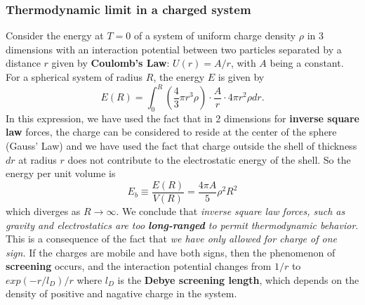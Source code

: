 \documentclass[12pt,titlepage]{article}
\numberwithin{equation}{section}
\begin{document}
\subsubsection{Thermodynamic limit in a charged system}
Consider the energy at $T=0$ of a system of uniform charge density $\rho$ in 3 dimensions with an interaction potential between two particles separated by a distance $r$ given by \textbf{Coulomb's Law}: $U(r)=A/r$, with $A$ being a constant. For a spherical system of radius $R$, the energy $E$ is given by 
\begin{equation}
\label{chargeint}
    E(R) = \int_0^R(\frac{4}{3}\pi r^3\rho)\cdot \frac{A}{r}\cdot 4\pi r^2\rho dr.
\end{equation}
In this expression, we have used the fact that in 2 dimensions for \textbf{inverse square law} forces, the charge can be considered to reside at the center of the sphere (Gauss' Law) and we have used the fact that charge outside the shell of thickness $dr$ at radius $r$ does not contribute to the electrostatic energy of the shell. So the energy per unit volume is 
\begin{equation}
    E_b\equiv\frac{E(R)}{V(R)}=\frac{4\pi A}{5}\rho^2R^2
\end{equation}
which diverges as $R\rightarrow\infty$. We conclude that \emph{inverse square law forces, such as gravity and electrostatics are too \textbf{long-ranged} to permit thermodynamic behavior}. This is a consequence of the fact that \emph{we have only allowed for charge of one sign.} If the charges are mobile and have both signs, then the phenomenon of \textbf{screening} occurs, and the interaction potential changes from $1/r$ to $exp(-r/\mathit{l}_D)/r$ where $\mathit{l}_D$ is the \textbf{Debye screening length}, which depends on the density of positive and nagative charge in the system.
\end{document}
